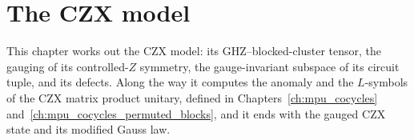 \chapter{The CZX model}
\label{ch:mpu_cocycles_czx}

This chapter works out the CZX model: its GHZ--blocked-cluster tensor, the
gauging of its controlled-$Z$ symmetry, the gauge-invariant subspace of its
circuit tuple, and its defects. Along the way it computes the anomaly and the
$L$-symbols of the CZX matrix product unitary, defined in
Chapters~\ref{ch:mpu_cocycles} and~\ref{ch:mpu_cocycles_permuted_blocks}, and
it ends with the gauged CZX state and its modified Gauss law.


